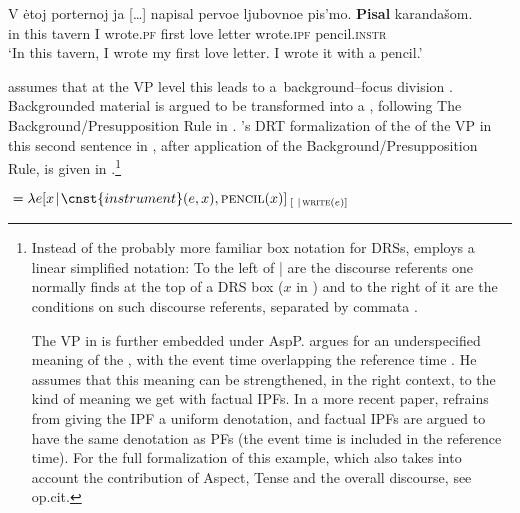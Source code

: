 \documentclass[output=paper,modfonts,newtxmath,hidelinks
\ChapterDOI{10.5281/zenodo.2545513}
]{langscibook}
\begin{document}
\ea\label{love letter} \gll V \.{e}toj porternoj ja [\dots] napisal pervoe ljubovnoe pis'mo. \textbf{Pisal} karandašom.\\
in this tavern I {} wrote.\textsc{pf} first love letter 			 wrote.\textsc{ipf} pencil.\textsc{instr}\\
\glt `In this tavern, I wrote my first love letter. I wrote it with a pencil.'
\z

\sloppy \noindent \citeauthor{gronndiss} assumes that at the VP level this  leads to a~background--focus division \citep[in the sense of][]{krifka01}. Backgrounded material is argued to be transformed into a , following The Background/Presupposition Rule in \citet{geurtssandt97}. \citeauthor{gronndiss}'s DRT formalization of the  of the VP in this second sentence in , after application of the Background/Presupposition Rule, is given in  \citep[][193]{gronndiss}.\footnote{Instead of the probably more familiar box notation for DRSs, \citeauthor{gronndiss} employs a linear simplified notation: To the left of | are the discourse referents one normally finds at the top of a DRS box ($x$ in ) and to the right of it are the conditions on such discourse referents, separated by commata \citep[for further discussion see][43]{gronndiss}. 

The VP in  is further embedded under AspP. \citet{gronndiss} argues for an underspecified meaning of the , with the event time overlapping the reference time  \citep[building on][]{klein95}. He assumes that this meaning can be strengthened, in the right context, to the kind of  meaning we get with factual IPFs. In a more recent paper, \citet{gronn15} refrains from giving the  IPF a uniform denotation, and factual IPFs are argued to have the same denotation as PFs (the event time is included in the reference time). For the full formalization of this example, which also takes into account the contribution of Aspect, Tense and the overall discourse, see op.cit.} 

\ea\label{gronnanalysis}
${}=\lambda e[x\hspace{0.1em} |\hspace{0.1em} \cnst{instrument}(e, x), \textsc{pencil}(x)]_{\hspace{2pt}[ \hspace{0.3em} |\hspace{0.1em}\textsc{write}(e)]}$
\z
	
\end{document}
